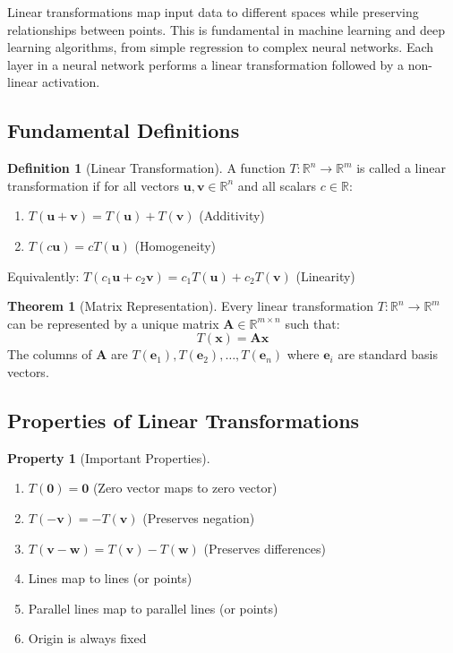 \documentclass[12pt,a4paper]{article}
\theoremstyle{definition}
\newtheorem{definition}{Definition}[section]
\newtheorem{theorem}{Theorem}[section]
\newtheorem{property}{Property}[section]
\begin{document}
\begin{tcolorbox}[enhanced,breakable,colback=defcolor,colframe=red!75!black,title=Why Linear Transformations in ML/DL?]
Linear transformations map input data to different spaces while preserving relationships between points. This is fundamental in machine learning and deep learning algorithms, from simple regression to complex neural networks. Each layer in a neural network performs a linear transformation followed by a non-linear activation.
\end{tcolorbox}

\subsection{Fundamental Definitions}

\begin{definition}[Linear Transformation]
A function $T: \mathbb{R}^n \rightarrow \mathbb{R}^m$ is called a linear transformation if for all vectors $\mathbf{u}, \mathbf{v} \in \mathbb{R}^n$ and all scalars $c \in \mathbb{R}$:
\begin{enumerate}
\item $T(\mathbf{u} + \mathbf{v}) = T(\mathbf{u}) + T(\mathbf{v})$ \quad (Additivity)
\item $T(c\mathbf{u}) = cT(\mathbf{u})$ \quad (Homogeneity)
\end{enumerate}

Equivalently: $T(c_1\mathbf{u} + c_2\mathbf{v}) = c_1T(\mathbf{u}) + c_2T(\mathbf{v})$ (Linearity)
\end{definition}

\begin{theorem}[Matrix Representation]
Every linear transformation $T: \mathbb{R}^n \rightarrow \mathbb{R}^m$ can be represented by a unique matrix $\mathbf{A} \in \mathbb{R}^{m \times n}$ such that:
\[
T(\mathbf{x}) = \mathbf{Ax}
\]
The columns of $\mathbf{A}$ are $T(\mathbf{e}_1), T(\mathbf{e}_2), \ldots, T(\mathbf{e}_n)$ where $\mathbf{e}_i$ are standard basis vectors.
\end{theorem}

\subsection{Properties of Linear Transformations}

\begin{property}[Important Properties]
\begin{enumerate}
\item $T(\mathbf{0}) = \mathbf{0}$ (Zero vector maps to zero vector)
\item $T(-\mathbf{v}) = -T(\mathbf{v})$ (Preserves negation)
\item $T(\mathbf{v} - \mathbf{w}) = T(\mathbf{v}) - T(\mathbf{w})$ (Preserves differences)
\item Lines map to lines (or points)
\item Parallel lines map to parallel lines (or points)
\item Origin is always fixed
\end{enumerate}
\end{property}
\end{document}
